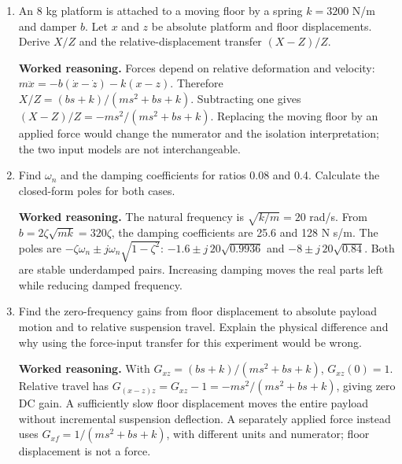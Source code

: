 \documentclass[10pt,a4paper]{article}
\newcommand{\answer}{\par\smallskip\textbf{Worked reasoning.} }
\begin{document}
\begin{enumerate}
\item An 8 kg platform is attached to a moving floor by a spring $k=3200$ N/m and damper $b$. Let $x$ and $z$ be absolute platform and floor displacements. Derive $X/Z$ and the relative-displacement transfer $(X-Z)/Z$.
\answer Forces depend on relative deformation and velocity: $m\ddot x=-b(\dot x-\dot z)-k(x-z)$. Therefore $X/Z=(bs+k)/(ms^2+bs+k)$. Subtracting one gives $(X-Z)/Z=-ms^2/(ms^2+bs+k)$. Replacing the moving floor by an applied force would change the numerator and the isolation interpretation; the two input models are not interchangeable.
\item Find $\omega_n$ and the damping coefficients for ratios 0.08 and 0.4. Calculate the closed-form poles for both cases.
\answer The natural frequency is $\sqrt{k/m}=20$ rad/s. From $b=2\zeta\sqrt{mk}=320\zeta$, the damping coefficients are 25.6 and 128 N s/m. The poles are $-\zeta\omega_n\pm j\omega_n\sqrt{1-\zeta^2}$: $-1.6\pm j\,20\sqrt{0.9936}$ and $-8\pm j\,20\sqrt{0.84}$. Both are stable underdamped pairs. Increasing damping moves the real parts left while reducing damped frequency.
\item Find the zero-frequency gains from floor displacement to absolute payload motion and to relative suspension travel. Explain the physical difference and why using the force-input transfer for this experiment would be wrong.
\answer With $G_{xz}=(bs+k)/(ms^2+bs+k)$, $G_{xz}(0)=1$. Relative travel has $G_{(x-z)z}=G_{xz}-1=-ms^2/(ms^2+bs+k)$, giving zero DC gain. A sufficiently slow floor displacement moves the entire payload without incremental suspension deflection. A separately applied force instead uses $G_{xf}=1/(ms^2+bs+k)$, with different units and numerator; floor displacement is not a force.
\end{enumerate}
\end{document}
